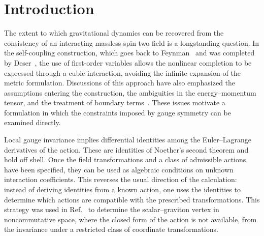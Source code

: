 \documentclass[prd,aps,preprint,superscriptaddress,nofootinbib,amsmath,amssymb,eqsecnum]{revtex4-2}
\begin{document}
\maketitle


\section{Introduction}
\label{sec:introduction}

The extent to which gravitational dynamics can be recovered from the consistency of an
interacting massless spin-two field is a longstanding question. In the self-coupling
construction, which goes back to Feynman~\cite{Feynman1995} and was completed by
Deser~\cite{Deser1970}, the use of first-order variables allows the nonlinear completion to
be expressed through a cubic interaction, avoiding the infinite expansion of the metric
formulation. Discussions of this approach have also emphasized the
assumptions entering the construction, the ambiguities in the energy--momentum tensor, and the
treatment of boundary terms~\cite{Padmanabhan2008,Deser2010}. These issues motivate a
formulation in which the constraints imposed by gauge symmetry can be examined directly.

Local gauge invariance implies differential identities among the Euler--Lagrange derivatives
of the action. These are identities of Noether's second theorem and hold off shell. Once the
field transformations and a class of admissible actions have been specified, they can be used
as algebraic conditions on unknown interaction coefficients. This reverses the usual direction
of the calculation: instead of deriving identities from a known action, one uses the
identities to determine which actions are compatible with the prescribed transformations.
This strategy was used in Ref.~\cite{BrandtElias2006} to determine the scalar--graviton
vertex in noncommutative space, where the closed form of the action is not available, from
the invariance under a restricted class of coordinate transformations.
\end{document}
